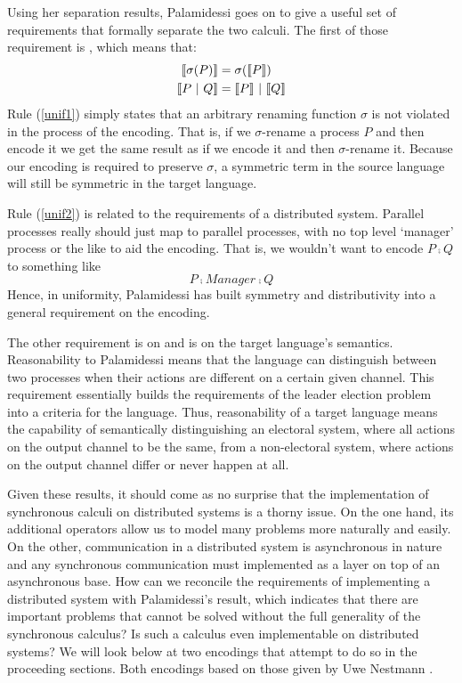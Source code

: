 Using her separation results, Palamidessi goes on to give a useful set of requirements that formally separate the two calculi.
The first of those requirement is , which means that:
\begin{align}
	\llbracket{\sigma(P)}\rrbracket &= \sigma(\llbracket{P}\rrbracket)\label{unif1}\\
	\llbracket{P \ensuremath{\ |\ } Q}\rrbracket &= \llbracket{P}\rrbracket \ |\  \llbracket{Q}\rrbracket\label{unif2}
\end{align}
Rule (\ref{unif1}) simply states that an arbitrary renaming function $\sigma$ is not violated in the process of the encoding.  
That is, if we $\sigma$-rename a process $P$ and then encode it we get the same result as if we encode it and then $\sigma$-rename it.  
Because our encoding is required to preserve $\sigma$, a symmetric term in the source language will still be symmetric in the target language.

Rule (\ref{unif2}) is related to the requirements of a distributed system.  
Parallel processes really should just map to parallel processes, with no top level `manager' process or the like to aid the encoding.
That is, we wouldn't want to encode $P \comp Q$ to something like 
\[
	P \comp Manager \comp Q
\]
Hence, in uniformity, Palamidessi has built symmetry and distributivity into a general requirement on the encoding.

The other requirement is on  and is on the target language's semantics.  
Reasonability to Palamidessi means that the language can distinguish between two processes when their actions are different on a certain given channel.  
This requirement essentially builds the requirements of the leader election problem into a criteria for the language.  
Thus, reasonability of a target language means the capability of semantically distinguishing an electoral system, where all actions on the output channel to be the same, from a non-electoral system, where actions on the output channel differ or never happen at all.

Given these results, it should come as no surprise that the implementation of synchronous calculi on distributed systems is a thorny issue.  
On the one hand, its additional operators allow us to model many problems more naturally and easily.  
On the other, communication in a distributed system is asynchronous in nature and any synchronous communication must implemented as a layer on top of an asynchronous base.  
How can we reconcile the requirements of implementing a distributed system with Palamidessi's result, which indicates that there are important problems that cannot be solved without the full generality of the synchronous calculus?  
Is such a calculus even implementable on distributed systems?
We will look below at two encodings that attempt to do so in the proceeding sections.  
Both encodings based on those given by Uwe Nestmann \cite{nestm00}.

